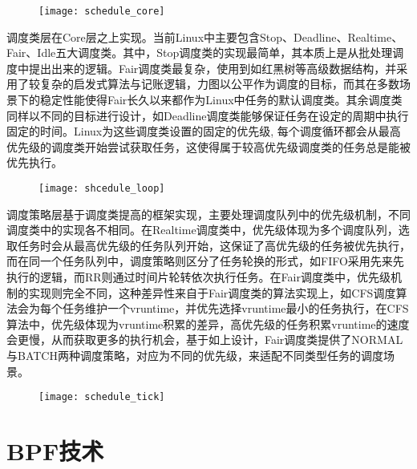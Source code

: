 \begin{figure}[!htbp]
    \centering
    \texttt{[image: schedule\_core]}
    \label{fig:schedule_core}
\end{figure}

调度类层在Core层之上实现。当前Linux中主要包含Stop、Deadline、Realtime、Fair、Idle五大调度类\citep{scheduler}。其中，Stop调度类的实现最简单，其本质上是从批处理调度中提出出来的逻辑。Fair调度类最复杂，使用到如红黑树等高级数据结构，并采用了较复杂的启发式算法与记账逻辑，力图以公平作为调度的目标，而其在多数场景下的稳定性能使得Fair长久以来都作为Linux中任务的默认调度类。其余调度类同样以不同的目标进行设计，如Deadline调度类能够保证任务在设定的周期中执行固定的时间。Linux为这些调度类设置的固定的优先级, 每个调度循环都会从最高优先级的调度类开始尝试获取任务，这使得属于较高优先级调度类的任务总是能被优先执行。

\begin{figure}[!htbp]
    \centering 
    \texttt{[image: shcedule\_loop]}
    \label{fig:shcedule_loop}
\end{figure}

调度策略层基于调度类提高的框架实现，主要处理调度队列中的优先级机制，不同调度类中的实现各不相同。在Realtime调度类中，优先级体现为多个调度队列，选取任务时会从最高优先级的任务队列开始，这保证了高优先级的任务被优先执行，而在同一个任务队列中，调度策略则区分了任务轮换的形式，如FIFO采用先来先执行的逻辑，而RR则通过时间片轮转依次执行任务。在Fair调度类中，优先级机制的实现则完全不同，这种差异性来自于Fair调度类的算法实现上，如CFS调度算法会为每个任务维护一个vruntime，并优先选择vruntime最小的任务执行，在CFS算法中，优先级体现为vruntime积累的差异，高优先级的任务积累vruntime的速度会更慢，从而获取更多的执行机会，基于如上设计，Fair调度类提供了NORMAL与BATCH两种调度策略，对应为不同的优先级，来适配不同类型任务的调度场景。

\begin{figure}[!htbp]
    \centering
    \texttt{[image: schedule\_tick]}
    \label{fig:schedule_tick}
\end{figure}

\section{BPF技术}


